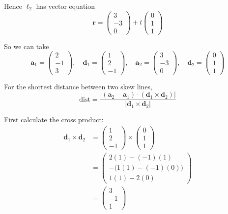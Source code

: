 \documentclass[leqno]{article}
\begin{document}
\begin{enumerate}[
  label=\textbf{\arabic*.},
  leftmargin=*,
  topsep=0pt,
  partopsep=0pt,
  parsep=0pt
]
\begin{tcolorbox}[colback=white, colframe=scarlet, title={\textbf{Solution}}, breakable, grow to left by=6mm, grow to right by=10mm]
\begin{enumerate}[label=\textbf{(\roman*)}]
  Hence \(\ell_2\) has vector equation
  \[
  \mathbf r=\begin{pmatrix}3\\-3\\0\end{pmatrix}+t\begin{pmatrix}0\\1\\1\end{pmatrix}
  \]

  So we can take
  \[
  \mathbf a_1=\begin{pmatrix}2\\-1\\3\end{pmatrix},\quad
  \mathbf d_1=\begin{pmatrix}1\\2\\-1\end{pmatrix},\quad
  \mathbf a_2=\begin{pmatrix}3\\-3\\0\end{pmatrix},\quad
  \mathbf d_2=\begin{pmatrix}0\\1\\1\end{pmatrix}
  \]

  For the shortest distance between two skew lines,
  \[
  \mathrm{dist}
  =\frac{\left\lvert(\mathbf a_2-\mathbf a_1)\cdot(\mathbf d_1\times\mathbf d_2)\right\rvert}
  {\left\lvert\mathbf d_1\times\mathbf d_2\right\rvert}
  \]

  First calculate the cross product:
  \begin{align*}
  \mathbf d_1\times\mathbf d_2
  &=\begin{pmatrix}1\\2\\-1\end{pmatrix}\times\begin{pmatrix}0\\1\\1\end{pmatrix}\\
  &=\begin{pmatrix}
  2(1)-(-1)(1)\\
  -\bigl(1(1)-(-1)(0)\bigr)\\
  1(1)-2(0)
  \end{pmatrix}\\
  &=\begin{pmatrix}3\\-1\\1\end{pmatrix}
  \end{align*}


\end{enumerate}
\end{tcolorbox}
\end{enumerate}
\end{document}

